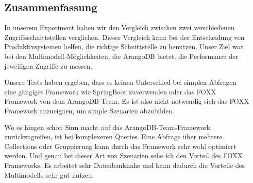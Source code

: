 
\subsection{Zusammenfassung}
In unserem Experiment haben wir den Vergleich zwischen zwei verschiedenen Zugriffsschnittstellen verglichen. Dieser Vergleich kann bei der Entscheidung von Produktivsystemen helfen, die richtige Schnittstelle zu benutzen. 
Unser Ziel war bei den Multimodell-Möglichkeiten, die ArangoDB bietet, die Performance der jeweiligen Zugriffe zu messen. 

Unsere Tests haben ergeben, dass es keinen Unterschied bei simplen Abfragen eine gängiges Framework wie SpringBoot zuverwenden oder das FOXX Framework von dem ArangoDB-Team. Es ist also nicht notwendig sich das FOXX Framework anzueignen, um simple Szenarien abzubilden.

Wo es hingen schon Sinn macht auf das ArangoDB-Team-Framework zurückzugreifen, ist bei komplexeren Queries. Eine Abfrage über mehrere Collections oder Gruppierung kann durch das Framework sehr wohl optimiert werden. Und genau bei dieser Art von Szenarien sehe ich den Vorteil des FOXX Frameworks. Es arbeitet sehr Datenbanknahe und kann dadurch die Vorteile des Multimodells sehr gut nutzen.